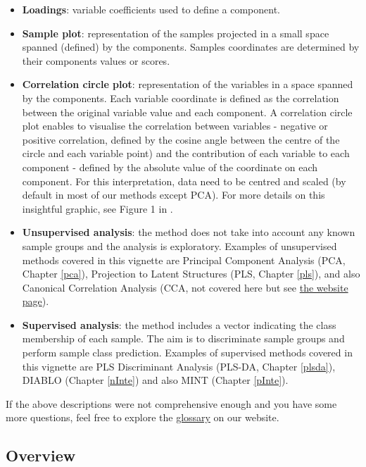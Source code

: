 \documentclass[
]{book}
\begin{document}
\begin{itemize}
\item
  \textbf{Loadings}: variable coefficients used to define a component.
\item
  \textbf{Sample plot}: representation of the samples projected in a small space spanned (defined) by the components. Samples coordinates are determined by their components values or scores.
\item
  \textbf{Correlation circle plot}: representation of the variables in a space spanned by the components. Each variable coordinate is defined as the correlation between the original variable value and each component. A correlation circle plot enables to visualise the correlation between variables - negative or positive correlation, defined by the cosine angle between the centre of the circle and each variable point) and the contribution of each variable to each component - defined by the absolute value of the coordinate on each component. For this interpretation, data need to be centred and scaled (by default in most of our methods except PCA). For more details on this insightful graphic, see Figure 1 in \citep{Gon12}.
\item
  \textbf{Unsupervised analysis}: the method does not take into account any known sample groups and the analysis is exploratory. Examples of unsupervised methods covered in this vignette are Principal Component Analysis (PCA, Chapter \ref{pca}), Projection to Latent Structures (PLS, Chapter \ref{pls}), and also Canonical Correlation Analysis (CCA, not covered here but see \href{http://mixomics.org/methods/rcca/}{the website page}).
\item
  \textbf{Supervised analysis}: the method includes a vector indicating the class membership of each sample. The aim is to discriminate sample groups and perform sample class prediction. Examples of supervised methods covered in this vignette are PLS Discriminant Analysis (PLS-DA, Chapter \ref{plsda}), DIABLO (Chapter \ref{nInte}) and also MINT (Chapter \ref{pInte}).
\end{itemize}

If the above descriptions were not comprehensive enough and you have some more questions, feel free to explore the \href{http://mixomics.org/faq/glossary/}{glossary} on our website.

\hypertarget{01:overview}{%
\subsection{Overview}\label{01:overview}}
\end{document}

